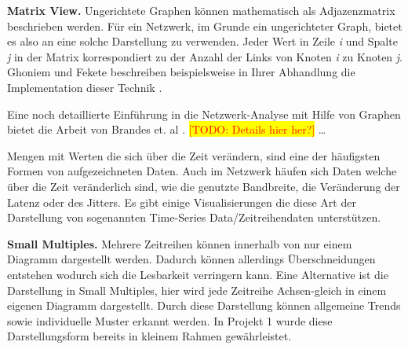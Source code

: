 \documentclass[draft=false
              ,paper=a4
              ,twoside=false
              ,fontsize=11pt
              ,headsepline
              ,BCOR10mm
              ,DIV11
              ]{scrbook}
\newcommand{\TODO}[1]{\colorbox{yellow}{\textcolor{red}{[TODO: #1]}}}
\begin{document}
\textbf{Matrix View.} Ungerichtete Graphen können mathematisch als Adjazenzmatrix beschrieben werden. Für ein Netzwerk, im Grunde ein ungerichteter Graph, bietet es also an eine solche Darstellung zu verwenden. Jeder Wert in Zeile \textit{i} und Spalte \textit{j} in der Matrix korrespondiert zu der Anzahl der Links von Knoten \textit{i} zu Knoten \textit{j}. Ghoniem und Fekete beschreiben beispielsweise in Ihrer Abhandlung die Implementation dieser Technik \cite{Ghoniem:2003:MVG:1063669.1063698}.

Eine noch detaillierte Einführung in die Netzwerk-Analyse mit Hilfe von Graphen bietet die Arbeit von Brandes et. al \cite{brandes2005network}. \TODO{Details hier her?}
\ldots

Mengen mit Werten die sich über die Zeit verändern, sind eine der häufigsten Formen von aufgezeichneten Daten. Auch im Netzwerk häufen sich Daten welche über die Zeit veränderlich sind, wie die genutzte Bandbreite, die Veränderung der Latenz oder des Jitters. Es gibt einige Visualisierungen die diese Art der Darstellung von sogenannten Time-Series Data/Zeitreihendaten unterstützen. 

\textbf{Small Multiples.} Mehrere Zeitreihen können innerhalb von nur einem Diagramm dargestellt werden. Dadurch können allerdings Überschneidungen entstehen wodurch sich die Lesbarkeit verringern kann. Eine Alternative ist die Darstellung in Small Multiples, hier wird jede Zeitreihe Achsen-gleich in einem eigenen Diagramm dargestellt. Durch diese Darstellung können allgemeine Trends sowie individuelle Muster erkannt werden. In Projekt 1 wurde diese Darstellungsform bereits in kleinem Rahmen gewährleistet. 
\end{document}
